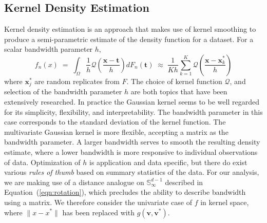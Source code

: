 \subsection{Kernel Density Estimation}
Kernel density estimation is an approach that makes use of 
    kernel smoothing to produce a semi-parametric estimate of the density
    function for a dataset.  For a scalar bandwidth parameter $h$,
    \[
        f_n(x) \;=\; 
            \int_{\Omega}\frac{1}{h}
                \mathcal{Q}\left(\frac{ \bm{x} - \bm{t}}{h}\right)dF_n(\bm{t}) 
            \;\approx\;
            \frac{1}{Kh}\sum_{k = 1}^K
                \mathcal{Q}\left(\frac{ \bm{x} - \bm{x}_k^{*}}{h}\right)
    \]
    where $\bm{x}_j^{*}$ are random replicates from $F$.  The choice of kernel function 
    $\mathcal{Q}$, and selection of the bandwidth parameter $h$ are both topics that have
    been extensively researched. In practice the Gaussian kernel seems to be 
    well regarded for its simplicity, flexibility, and interpretability.  The
    bandwidth parameter in this case corresponds to the standard deviation 
    of the kernel function.  The multivariate Gaussian kernel is more flexible,
    accepting a matrix as the bandwidth parameter.  A larger bandwidth serves 
    to smooth the resulting density estimate, where a lower bandwidth is more 
    responsive to individual observations of data.  Optimization of $h$ is 
    application and data specific, but there do exist various 
    \emph{rules of thumb} based on summary statistics of the data. For our 
    analysis, we are making use of a distance analogue on 
    $\mathbb{S}_{\infty}^{d-1}$ described in Equation~(\ref{eqn:rotation}), 
    which precludes the ability to describe bandwidth using a matrix.  We 
    therefore consider the univariate case of $f$ in kernel space, where 
    $\lVert x - x^*\rVert$ has been replaced with $g(\bm{v}, \bm{v}^*)$.

